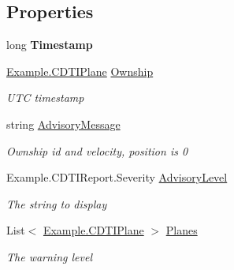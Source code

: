 \subsection*{Properties}
\begin{DoxyCompactItemize}
\item 
long {\bfseries Timestamp}\hypertarget{class_example_1_1_c_d_t_i_report_aa757cb6e78cfd34982eecc6f381c5450}{}\label{class_example_1_1_c_d_t_i_report_aa757cb6e78cfd34982eecc6f381c5450}

\item 
\hyperlink{class_example_1_1_c_d_t_i_plane}{Example.\+C\+D\+T\+I\+Plane} \hyperlink{class_example_1_1_c_d_t_i_report_ad40efe2d19d10dabc930320ba2835337}{Ownship}
\begin{DoxyCompactList}\small\item\em U\+TC timestamp\end{DoxyCompactList}\item 
string \hyperlink{class_example_1_1_c_d_t_i_report_a6859a3fc5d356d9125d589e23a6cc2b9}{Advisory\+Message}
\begin{DoxyCompactList}\small\item\em Ownship id and velocity, position is 0\end{DoxyCompactList}\item 
Example.\+C\+D\+T\+I\+Report.\+Severity \hyperlink{class_example_1_1_c_d_t_i_report_a55ef7e8b3e35eeeb0b273fd3c475ba31}{Advisory\+Level}
\begin{DoxyCompactList}\small\item\em The string to display\end{DoxyCompactList}\item 
List$<$ \hyperlink{class_example_1_1_c_d_t_i_plane}{Example.\+C\+D\+T\+I\+Plane} $>$ \hyperlink{class_example_1_1_c_d_t_i_report_a73959c38addf562d6b64ecb538db006a}{Planes}
\begin{DoxyCompactList}\small\item\em The warning level\end{DoxyCompactList}\end{DoxyCompactItemize}


